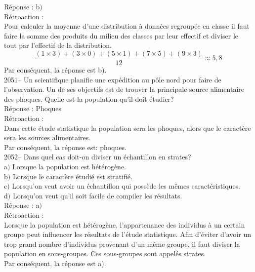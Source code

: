 \documentclass[letterpaper, 12pt]{article}
\begin{document}
R\'eponse : b$)$\\

R\'etroaction :\\
Pour calculer la moyenne d'une distribution \`a donn\'ees regroup\'ee en classe il faut faire la somme des produits du milieu des classes par leur effectif et diviser le tout par l'effectif de la distribution.
\begin{equation*}
 \frac{(1 \times 3) +(3 \times 0)+(5 \times 1)+(7 \times 5)+(9 \times 3)}{12} \approx 5,8
\end{equation*}
Par cons\'equent, la r\'eponse est b).\\

2051-- Un scientifique planifie une exp\'edition au p\^ole nord pour faire de l'observation. Un de ses objectifs est de trouver la principale source alimentaire des phoques. Quelle est la population qu'il doit \'etudier? \\


R\'eponse : Phoques\\

R\'etroaction :\\
Dans cette \'etude statistique la population sera les phoques, alors que le caract\`ere sera les sources alimentaires.\\
Par cons\'equent, la r\'eponse est: phoques.\\


2052-- Dans quel cas doit-on diviser un \'echantillon en strates? \\

a$)$ Lorsque la population est h\'et\'erog\`ene. \\
b$)$ Lorsque le caract\`ere \'etudi\'e est stratifi\'e. \\
c$)$ Lorsqu'on veut avoir un \'echantillon qui poss\`ede les m\^emes caract\'eristiques.\\
d$)$ Lorsqu'on veut qu'il soit facile de compiler les r\'esultats.\\

R\'eponse : a$)$\\

R\'etroaction :\\
Lorsque la population est h\'et\'erog\`ene, l'appartenance des individus \`a un certain groupe peut influencer les r\'esultats de l'\'etude statistique. Afin d'\'eviter d'avoir un trop grand nombre d'individus provenant d'un m\^eme groupe, il faut diviser la population en sous-groupes. Ces sous-groupes sont appel\'es strates. \\
Par cons\'equent, la r\'eponse est a).\\
\end{document}
